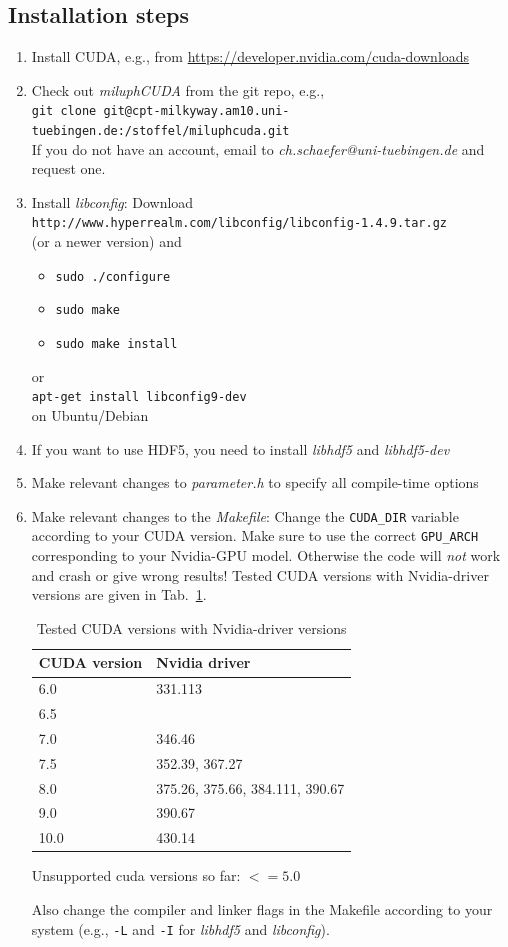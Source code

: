 \documentclass[10pt,fleqn,twoside]{article}
\begin{document}
\subsection{Installation steps}
\begin{enumerate}
\item Install CUDA, e.g., from \url{https://developer.nvidia.com/cuda-downloads}
\item Check out \emph{miluphCUDA} from the git repo, e.g.,\\ \verb|git clone git@cpt-milkyway.am10.uni-tuebingen.de:/stoffel/miluphcuda.git|\\
If you do not have an account, email to \emph{ch.schaefer@uni-tuebingen.de} and request one.
\item Install \emph{libconfig}: Download\\
\verb|http://www.hyperrealm.com/libconfig/libconfig-1.4.9.tar.gz|\\
(or a newer version) and
\begin{itemize}
\item \verb|sudo ./configure|
\item \verb|sudo make|
\item \verb|sudo make install|
\end{itemize}
or\\
\verb|apt-get install libconfig9-dev|\\
on Ubuntu/Debian
\item If you want to use HDF5, you need to install \emph{libhdf5} and \emph{libhdf5-dev}
\item Make relevant changes to \emph{parameter.h} to specify all compile-time options
\item Make relevant changes to the \emph{Makefile}: Change the \verb|CUDA_DIR| variable according to your CUDA version. Make sure to use the correct \verb|GPU_ARCH| corresponding to your Nvidia-GPU model. Otherwise the code will \emph{not} work and crash or give wrong results!
Tested CUDA versions with Nvidia-driver versions are given in Tab.~\ref{tab:cuda_driver}.

\begin{table}
\centering
\caption{Tested CUDA versions with Nvidia-driver versions}
\begin{tabular}[h]{p{3cm} p{3cm}}
\hline
CUDA version	&	Nvidia driver	\\
\hline
6.0		&	331.113\\
6.5		&	\\
7.0		&	346.46	\\
7.5		&	352.39, 367.27	\\
8.0		&	375.26, 375.66, 384.111, 390.67	\\
9.0		&	390.67	\\
10.0	&	430.14 \\  \hline
\end{tabular}
\label{tab:cuda_driver}
\end{table}

Unsupported cuda versions so far: $<= 5.0$

Also change the compiler and linker flags in the Makefile according to your system (e.g., \verb|-L| and \verb|-I| for \emph{libhdf5} and \emph{libconfig}).
\end{enumerate}
\end{document}
